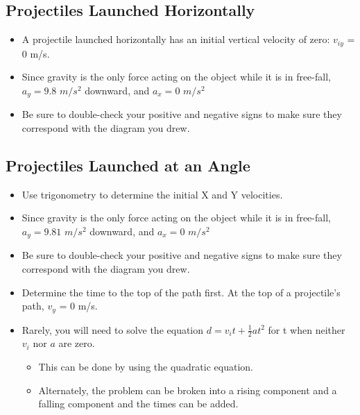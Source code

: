 \documentclass[letterpaper, 12pt]{article}
\begin{document}
 

\subsection*{Projectiles Launched Horizontally}
\begin{itemize}
	\item A projectile launched horizontally has an initial vertical velocity of zero: $v_{iy}$  = 0 m/s.  
	\item Since gravity is the only force acting on the object while it is in free-fall, $a_y = 9.8$ $m/s^2$ downward, and $a_x = 0$ $m/s^2$
	\item Be sure to double-check your positive and negative signs to make sure they correspond with the diagram you drew.
	
\end{itemize}

\subsection*{Projectiles Launched at an Angle}
	\begin{itemize}
	\item Use trigonometry to determine the initial X and Y velocities. 
	\item Since gravity is the only force acting on the object while it is in free-fall, $a_y = 9.81$ $m/s^2$ downward, and $a_x = 0$ $m/s^2$
	\item Be sure to double-check your positive and negative signs to make sure they correspond with the diagram you drew.
	\item Determine the time to the top of the path first.  At the top of a projectile's path, $v_{y}$ = 0 m/s.    
	\item Rarely, you will need to solve the equation $d = v_i t + \frac{1}{2}at^2$ for t when neither $v_i$ nor $a$ are zero. 
	\begin{itemize}
		\item This can be done by using the quadratic equation.
		\item  Alternately, the problem can be broken into a rising component and a falling component and the times can be added. 
	\end{itemize} 
	
	\end{itemize}


 
 
\end{document}

